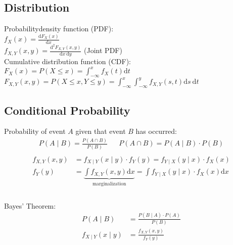 \begin{mdframed}[style=eqbox]
  \subsection{Distribution}
  Probabilitydensity function (PDF): \\
  $f_X(x) = \frac{\text{d} F_X(x)}{\text{d} x}$\\
  $f_{X,Y}(x,y) = \frac{\text{d}^2 F_{X,Y}(x,y)}{\text{d}x~\text{d}y}$ (Joint PDF)\\[0.5em]
  Cumulative distribution function (CDF): \\
  $F_X(x) = P({X \leq x}) = \int_{-\infty}^{x} f_X(t) \text{d} t$\\
  $F_{X,Y}(x,y) = P({X \leq x, Y \leq y}) = \int_{-\infty}^{x} \int_{-\infty}^{y} f_{X,Y}(s,t) \text{d}s~\text{d}t$
\end{mdframed}

\begin{mdframed}[style=eqbox]
  \subsection{Conditional Probability}
  Probability of event $A$ given that event $B$ has occurred:
  \begin{align*}
    P(A \mid B) = \frac{P(A \cap B)}{P(B)} && P(A \cap B) = P(A \mid B) \cdot P(B)\\
  \end{align*}
  \vspace*{-32pt}
  \begin{align*}
    f_{X,Y}(x,y) &= f_{X \mid Y}(x \mid y) \cdot f_Y(y) = f_{Y \mid X}(y \mid x) \cdot f_X(x)\\
    f_{Y}(y) &= \underbrace{\int f_{X,Y}(x,y) \text{d}x}_{\text{marginalization}} = \int f_{Y \mid X}(y \mid x) \cdot f_X(x) \text{d}x\\
  \end{align*}\vspace*{-24pt}\\
  Bayes' Theorem:
  \vspace*{-4pt}
  \begin{align*}
    P(A \mid B) &= \frac{P(B \mid A) \cdot P(A)}{P(B)}\\
    f_{X \mid Y}(x \mid y) &= \frac{f_{X,Y}(x,y)}{f_Y(y)}
  \end{align*}
\end{mdframed}

